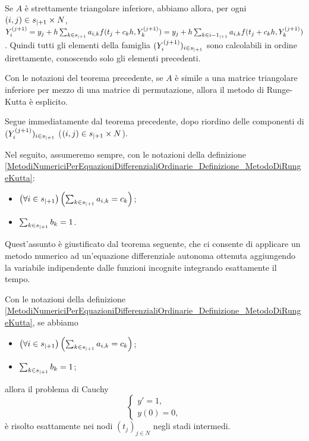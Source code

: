 \Proof Se $A$ \`e strettamente triangolare inferiore, abbiamo allora, per ogni $(i,j) \in {s}_{|+ 1} \times N$,
$Y_i^{(j + 1)} = y_j + h\sum_{k \in {s}_{|+ 1}} a_{i,k}f(t_j + c_kh,Y_k^{(j + 1)}) = y_j + h\sum_{k \in {i - 1}_{|+ 1}} a_{i,k}f(t_j + c_kh,Y_k^{(j + 1)})$. Quindi tutti gli elementi della famiglia $(Y_i^{(j + 1)})_{i \in {s}_{|+ 1}}$ sono calcolabili in ordine direttamente, conoscendo solo gli elementi precedenti. \EndProof
\begin{Corollary}
	Con le notazioni del teorema precedente, se $A$ \`e simile a una matrice triangolare inferiore per mezzo di una matrice di permutazione, allora il metodo di Runge-Kutta \`e esplicito.
\end{Corollary}
\Proof Segue immediatamente dal teorema precedente, dopo riordino delle componenti di $(Y_i^{(j + 1)})_{i \in {s}_{|+ 1}}$ ($(i,j) \in {s}_{|+ 1} \times N$). \EndProof
\par Nel seguito, assumeremo sempre, con le notazioni della definizione \ref{MetodiNumericiPerEquazioniDifferenzialiOrdinarie_Definizione_MetodoDiRungeKutta}:
\begin{itemize}
	\item $\left ( \forall i \in {s}_{|+ 1} \right ) \left ( \sum_{k \in {s}_{|+ 1}} a_{i,k} = c_k \right )$;
	\item $\sum_{k \in {s}_{|+ 1}} b_k = 1$.
\end{itemize}
\par Quest'assunto \`e giustificato dal teorema seguente, che ci consente di applicare un metodo numerico ad un'equazione differenziale autonoma ottenuta aggiungendo la variabile indipendente dalle funzioni incognite integrando esattamente il tempo.
\begin{Theorem}
	Con le notazioni della definizione \ref{MetodiNumericiPerEquazioniDifferenzialiOrdinarie_Definizione_MetodoDiRungeKutta}, se abbiamo
	\begin{itemize}
		\item $\left ( \forall i \in {s}_{|+ 1} \right ) \left ( \sum_{k \in {s}_{|+ 1}} a_{i,k} = c_k \right )$;
		\item $\sum_{k \in {s}_{|+ 1}} b_k = 1$;
	\end{itemize}
	allora il problema di Cauchy
	\[
	\begin{cases}
		y' = 1,\\
		y(0) = 0,
	\end{cases}
	\]
	\`e risolto esattamente nei nodi $(t_j)_{j \in N}$ negli stadi intermedi.
\end{Theorem}
